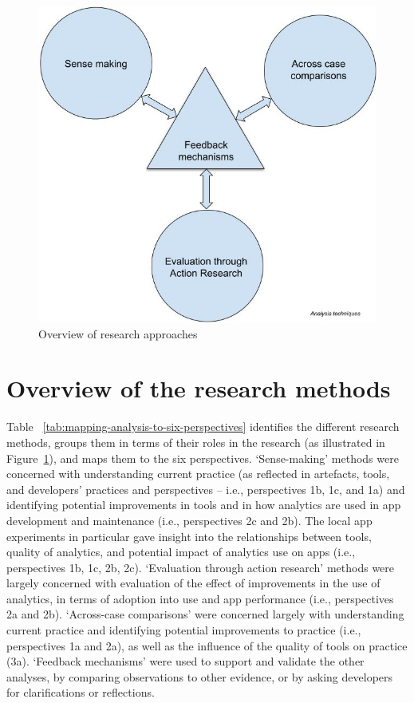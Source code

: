 \begin{figure}
    \centering
    \includegraphics[width=12cm]{images/my/analysis-techniques-in-PhD-25-Oct-2021.jpeg}
    \caption{Overview of research approaches}
    \label{fig:analysis-techniques-in-phd}
\end{figure}

\section{Overview of the research methods}

Table ~\ref{tab:mapping-analysis-to-six-perspectives} identifies the different research methods, groups them in terms of their roles in the research (as illustrated in Figure~\ref{fig:analysis-techniques-in-phd}), and maps them to the six perspectives.  
`Sense-making' methods were concerned with understanding current practice (as reflected in artefacts, tools, and developers' practices and perspectives -- i.e., perspectives 1b, 1c, and 1a) and identifying potential improvements in tools and in how analytics are used in app development and maintenance (i.e., perspectives 2c and 2b). The local app experiments in particular gave insight into the relationships between tools, quality of analytics, and potential impact of analytics use on apps (i.e., perspectives 1b, 1c, 2b, 2c). 
`Evaluation through action research' methods were largely concerned with evaluation of the effect of improvements in the use of analytics, in terms of adoption into use and app performance (i.e., perspectives 2a and 2b).
`Across-case comparisons' were concerned largely with understanding current practice and identifying potential improvements to practice (i.e., perspectives 1a and 2a), as well as the influence of the quality of tools on practice (3a).
`Feedback mechanisms' were used to support and validate the other analyses, by comparing observations to other evidence, or by asking developers for clarifications or reflections. 

